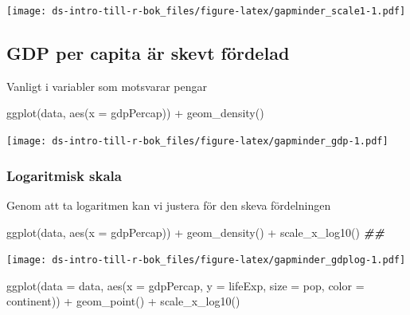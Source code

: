 \documentclass[
]{book}
\newenvironment{Shaded}{\begin{snugshade}}{\end{snugshade}}
\newcommand{\AttributeTok}[1]{\textcolor[rgb]{0.77,0.63,0.00}{#1}}
\newcommand{\DocumentationTok}[1]{\textcolor[rgb]{0.56,0.35,0.01}{\textbf{\textit{#1}}}}
\newcommand{\FunctionTok}[1]{\textcolor[rgb]{0.00,0.00,0.00}{#1}}
\newcommand{\NormalTok}[1]{#1}
\newcommand{\SpecialCharTok}[1]{\textcolor[rgb]{0.00,0.00,0.00}{#1}}
\begin{document}
\texttt{[image: ds-intro-till-r-bok\_files/figure-latex/gapminder\_scale1-1.pdf]}

\hypertarget{gdp-per-capita-uxe4r-skevt-fuxf6rdelad}{%
\subsection{GDP per capita är skevt fördelad}\label{gdp-per-capita-uxe4r-skevt-fuxf6rdelad}}

Vanligt i variabler som motsvarar pengar

\begin{Shaded}
\begin{Highlighting}[]
\FunctionTok{ggplot}\NormalTok{(data, }\FunctionTok{aes}\NormalTok{(}\AttributeTok{x =}\NormalTok{ gdpPercap)) }\SpecialCharTok{+}
  \FunctionTok{geom\_density}\NormalTok{()}
\end{Highlighting}
\end{Shaded}

\texttt{[image: ds-intro-till-r-bok\_files/figure-latex/gapminder\_gdp-1.pdf]}

\hypertarget{logaritmisk-skala}{%
\subsubsection{Logaritmisk skala}\label{logaritmisk-skala}}

Genom att ta logaritmen kan vi justera för den skeva fördelningen

\begin{Shaded}
\begin{Highlighting}[]
\FunctionTok{ggplot}\NormalTok{(data, }\FunctionTok{aes}\NormalTok{(}\AttributeTok{x =}\NormalTok{ gdpPercap)) }\SpecialCharTok{+}
  \FunctionTok{geom\_density}\NormalTok{() }\SpecialCharTok{+}
  \FunctionTok{scale\_x\_log10}\NormalTok{() }\DocumentationTok{\#\#}
\end{Highlighting}
\end{Shaded}

\texttt{[image: ds-intro-till-r-bok\_files/figure-latex/gapminder\_gdplog-1.pdf]}

\begin{Shaded}
\begin{Highlighting}[]
\FunctionTok{ggplot}\NormalTok{(}\AttributeTok{data =}\NormalTok{ data, }\FunctionTok{aes}\NormalTok{(}\AttributeTok{x =}\NormalTok{ gdpPercap,}
                                  \AttributeTok{y =}\NormalTok{ lifeExp,}
                                  \AttributeTok{size =}\NormalTok{ pop,}
                                  \AttributeTok{color =}\NormalTok{ continent)) }\SpecialCharTok{+}
  \FunctionTok{geom\_point}\NormalTok{() }\SpecialCharTok{+}
  \FunctionTok{scale\_x\_log10}\NormalTok{() }
\end{Highlighting}
\end{Shaded}
\end{document}
